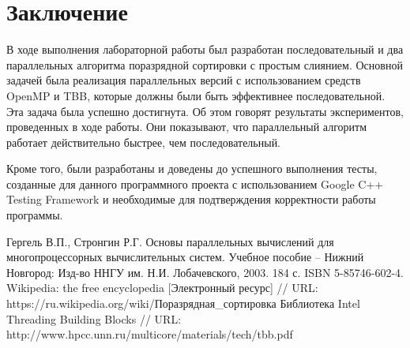 \documentclass{report}
\begin{document}
\newpage 

\section*{Заключение}
В ходе выполнения лабораторной работы был разработан последовательный и два параллельных алгоритма поразрядной сортировки с простым слиянием. Основной задачей была реализация параллельных версий с использованием средств OpenMP и TBB, которые должны были быть эффективнее последовательной. Эта задача была успешно достигнута. Об этом говорят результаты экспериментов, проведенных в ходе работы. Они показывают, что параллельный алгоритм работает действительно быстрее, чем последовательный. 
\par Кроме того, были разработаны и доведены до успешного выполнения тесты, созданные для данного программного проекта с использованием Google C++ Testing Framework и необходимые для подтверждения корректности работы программы.
\newpage

\begin{thebibliography}{1}
 Гергель В.П., Стронгин Р.Г. Основы параллельных вычислений для многопроцессорных вычислительных систем. Учебное пособие – Нижний Новгород: Изд-во ННГУ им. Н.И. Лобачевского, 2003. 184 с. ISBN 5-85746-602-4. 
 Wikipedia: the free encyclopedia [Электронный ресурс] // URL: https://ru.wikipedia.org/wiki/Поразрядная\_сортировка
 Библиотека Intel Threading Building Blocks // URL: http://www.hpcc.unn.ru/multicore/materials/tech/tbb.pdf
\end{thebibliography}
\newpage

\end{document}
